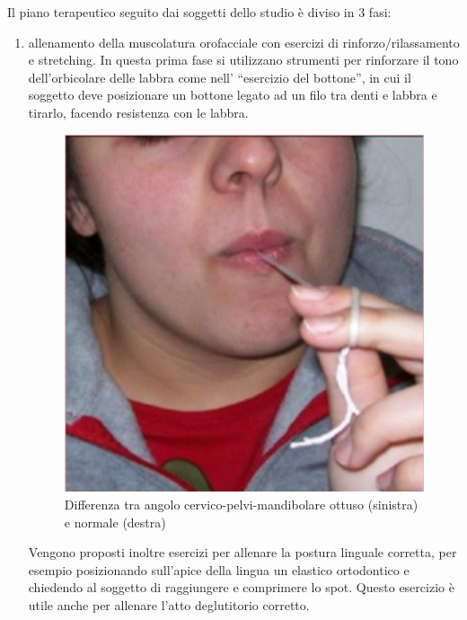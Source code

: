 Il piano terapeutico seguito dai soggetti dello studio è diviso in 3 fasi:
\begin{enumerate}
\item allenamento della muscolatura orofacciale con esercizi di rinforzo/rilassamento e stretching. In questa prima fase si utilizzano strumenti per rinforzare il tono dell’orbicolare delle labbra come nell’ “esercizio del bottone”, in cui il soggetto deve posizionare un bottone legato ad un filo tra denti e labbra e tirarlo, facendo resistenza con le labbra.

\begin{figure}[h!]
	\centering
	\includegraphics[scale=0.26]{source/immagini/esercizio_del_bottone.png}
	\caption[Semantic Web stack]{Differenza tra angolo cervico-pelvi-mandibolare ottuso (sinistra) e normale (destra)}
	\label{fig:issuexample}
\end{figure}
 
Vengono proposti inoltre esercizi per allenare la postura linguale corretta, per esempio posizionando sull’apice della lingua un elastico ortodontico e chiedendo al soggetto di raggiungere e comprimere lo spot. Questo esercizio è utile anche per allenare l’atto deglutitorio corretto.


\end{enumerate}
